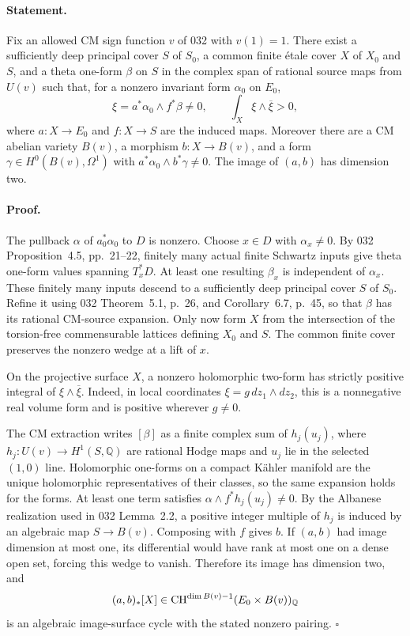 \documentclass[11pt]{article}
\newcommand{\Q}{\mathbb Q}\newcommand{\C}{\mathbb C}\newcommand{\Z}{\mathbb Z}\newcommand{\R}{\mathbb R}\newcommand{\A}{\mathbb A}\newcommand{\OO}{\mathcal O}
\theoremstyle{definition}\newtheorem{definition}[theorem]{Definition}\newtheorem{remark}[theorem]{Remark}
\begin{document}
\paragraph{Statement.}
Fix an allowed CM sign function $v$ of 032 with $v(1)=1$.
There exist a sufficiently deep principal cover $S$ of $S_0$, a
common finite \'etale cover $X$ of $X_0$ and $S$, and a theta
one-form $\beta$ on $S$ in the complex span of rational source maps
from $U(v)$ such that, for a nonzero invariant form $\alpha_0$ on
$E_0$,
\[
 \xi=a^*\alpha_0\wedge f^*\beta\ne0,
 \qquad \int_X\xi\wedge\overline\xi>0,
\]
where $a:X\to E_0$ and $f:X\to S$ are the induced maps. Moreover
there are a CM abelian variety $B(v)$, a morphism $b:X\to B(v)$,
and a form $\gamma\in H^0(B(v),\Omega^1)$ with
$a^*\alpha_0\wedge b^*\gamma\ne0$. The image of $(a,b)$ has
dimension two.

\paragraph{Proof.}
The pullback $\alpha$ of $a_0^*\alpha_0$ to $D$ is nonzero. Choose
$x\in D$ with $\alpha_x\ne0$. By 032 Proposition~4.5,
pp.~21--22, finitely many actual finite Schwartz inputs give theta
one-form values spanning $T_x^*D$. At least one resulting $\beta_x$
is independent of $\alpha_x$. These finitely many inputs descend to
a sufficiently deep principal cover $S$ of $S_0$. Refine it using
032 Theorem~5.1, p.~26, and Corollary~6.7, p.~45, so that $\beta$
has its rational CM-source expansion. Only now form $X$ from the
intersection of the torsion-free commensurable lattices defining
$X_0$ and $S$. The common finite cover preserves the nonzero wedge
at a lift of $x$.

On the projective surface $X$, a nonzero holomorphic two-form has
strictly positive integral of $\xi\wedge\overline\xi$. Indeed, in
local coordinates $\xi=g\,dz_1\wedge dz_2$, this is a nonnegative
real volume form and is positive wherever $g\ne0$.

The CM extraction writes $[\beta]$ as a finite complex sum of
$h_j(u_j)$, where $h_j:U(v)\to H^1(S,\Q)$ are rational Hodge maps
and $u_j$ lie in the selected $(1,0)$ line. Holomorphic one-forms on
a compact K\"ahler manifold are the unique holomorphic
representatives of their classes, so the same expansion holds for
the forms. At least one term satisfies
$\alpha\wedge f^*h_j(u_j)\ne0$. By the Albanese realization used
in 032 Lemma~2.2, a positive integer multiple of $h_j$ is induced
by an algebraic map $S\to B(v)$. Composing with $f$ gives $b$.
If $(a,b)$ had image dimension at most one, its differential would
have rank at most one on a dense open set, forcing this wedge to
vanish. Therefore its image has dimension two, and
\[
 (a,b)_*[X]\in
 \CH^{\dim B(v)-1}(E_0\times B(v))_{\Q}
\]
is an algebraic image-surface cycle with the stated nonzero pairing.
$\square$
\end{document}
